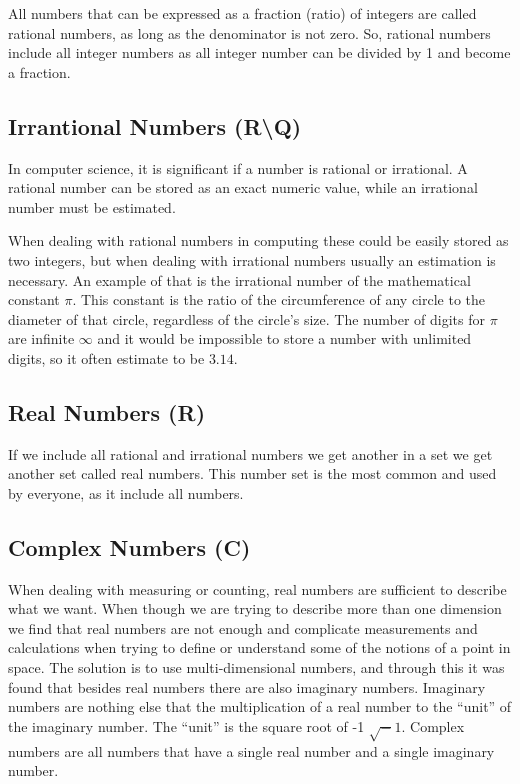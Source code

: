 \documentclass[
]{book}
\begin{document}
All numbers that can be expressed as a fraction (ratio) of integers are called rational numbers, as long as the denominator is not zero. So, rational numbers include all integer numbers as all integer number can be divided by 1 and become a fraction.

\hypertarget{irrantional-numbers-rq}{%
\subsection{Irrantional Numbers (R\textbackslash Q)}\label{irrantional-numbers-rq}}

In computer science, it is significant if a number is rational or irrational. A rational number can be stored as an exact numeric value, while an irrational number must be estimated.

When dealing with rational numbers in computing these could be easily stored as two integers, but when dealing with irrational numbers usually an estimation is necessary.
An example of that is the irrational number of the mathematical constant \(\pi\). This constant is the ratio of the circumference of any circle to the diameter of that circle, regardless of the circle's size. The number of digits for \(\pi\) are infinite \(\infty\) and it would be impossible to store a number with unlimited digits, so it often estimate to be \(3.14\).

\hypertarget{real-numbers-r}{%
\subsection{Real Numbers (R)}\label{real-numbers-r}}

If we include all rational and irrational numbers we get another in a set we get another set called real numbers.
This number set is the most common and used by everyone, as it include all numbers.

\hypertarget{complex-numbers-c}{%
\subsection{Complex Numbers (C)}\label{complex-numbers-c}}

When dealing with measuring or counting, real numbers are sufficient to describe what we want. When though we are trying to describe more than one dimension we find that real numbers are not enough and complicate measurements and calculations when trying to define or understand some of the notions of a point in space. The solution is to use multi-dimensional numbers, and through this it was found that besides real numbers there are also imaginary numbers. Imaginary numbers are nothing else that the multiplication of a real number to the ``unit'' of the imaginary number. The ``unit'' is the square root of -1 \(\sqrt-1\).
Complex numbers are all numbers that have a single real number and a single imaginary number.
\end{document}
